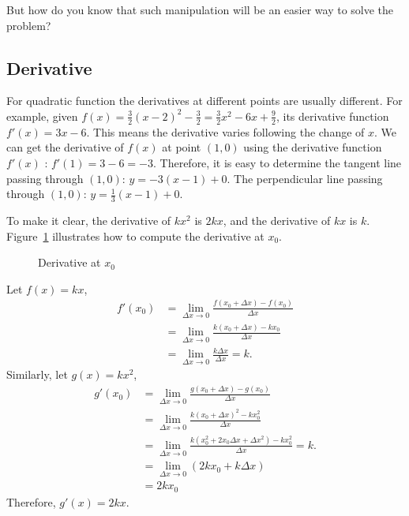 \documentclass[11pt, oneside]{article}   	%
\begin{document}
But how do you know that such manipulation will be an easier way to solve the problem?

\subsection{Derivative}
For quadratic function the derivatives at different points are usually different. For example, given $f(x)=\frac{3}{2}(x-2)^2-\frac{3}{2}=\frac{3}{2}x^2-6x+\frac{9}{2}$, its derivative function $f'(x)=3x-6$. This means the derivative varies following the change of $x$. We can get the derivative of $f(x)$ at point $(1,0)$ using the derivative function $f'(x)$ : $f'(1)=3-6=-3$. Therefore, it is easy to determine the tangent line passing through $(1,0)$: $y=-3(x-1)+0$. The perpendicular line passing through $(1,0)$: $y=\frac{1}{3}(x-1)+0$. 

To make it clear, the derivative of $kx^2$ is $2kx$, and the derivative of $kx$ is $k$.  Figure~\ref{fig:derivative} illustrates how to compute the derivative at $x_0$.
\begin{figure}
\centering
{}
\caption{Derivative at $x_0$}
\label{fig:derivative}
\end{figure}


Let $f(x)=kx$, 
\begin{align*}
f'(x_0) &=\lim_{\Delta x \rightarrow 0} \frac{f(x_0+\Delta x) - f(x_0)}{\Delta x}\\
&=\lim_{\Delta x \rightarrow 0} \frac{k(x_0+\Delta x) - kx_0}{\Delta x}\\
&=\lim_{\Delta x \rightarrow 0} \frac{k \Delta x}{\Delta x}=k.
\end{align*}
Similarly, let $g(x) = kx^2$,
\begin{align*}
g'(x_0) &=\lim_{\Delta x \rightarrow 0} \frac{g(x_0+\Delta x) - g(x_0)}{\Delta x}\\
&=\lim_{\Delta x \rightarrow 0} \frac{k(x_0+\Delta x)^2 - kx_0^2}{\Delta x}\\
&=\lim_{\Delta x \rightarrow 0} \frac{k(x_0^2+2x_0 \Delta x + \Delta x^2)-kx_0^2}{\Delta x}=k.\\
&=\lim_{\Delta x \rightarrow 0} (2k x_0+k \Delta x)\\
&=2kx_0
\end{align*}
Therefore, $g'(x)=2kx$.
\end{document}
